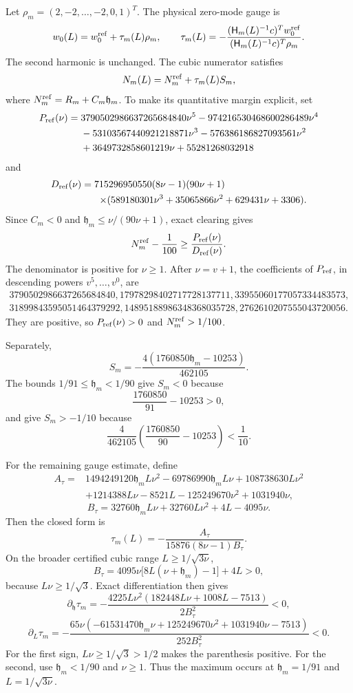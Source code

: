 \documentclass[10pt]{article}
\newcommand{\1}{\mathbf1}
\begin{document}
Let
$\rho_m=(2,-2,\ldots,-2,0,1)^T$.  The physical zero-mode gauge is
\[
 w_0(L)=w_0^{\rm ref}+\tau_m(L)\rho_m,
 \qquad
 \tau_m(L)=-\frac{(\mathsf H_m(L)^{-1}c)^Tw_0^{\rm ref}}
 {(\mathsf H_m(L)^{-1}c)^T\rho_m}.
\]
The second harmonic is unchanged.  The cubic numerator satisfies
\[
 N_m(L)=N_m^{\rm ref}+\tau_m(L)S_m,
\]
where $N_m^{\rm ref}=R_m+C_m\mathfrak h_m$.  To make its quantitative margin
explicit, set
\begin{align*}
 P_{\rm ref}(\nu)={}&3790502986637265684840\nu^5
 -974216530468600286489\nu^4\\
 &-53103567440921218871\nu^3
 -576386186827093561\nu^2\\
 &+3649732858601219\nu+55281268032918
\end{align*}
and
\begin{align*}
 D_{\rm ref}(\nu)={}&715296950550(8\nu-1)(90\nu+1)\\
 &\mathrel{}\times
 (589180301\nu^3+35065866\nu^2+629431\nu+3306).
\end{align*}
Since $C_m<0$ and $\mathfrak h_m\le\nu/(90\nu+1)$, exact clearing gives
\[
 N_m^{\rm ref}-\frac1{100}
 \ge \frac{P_{\rm ref}(\nu)}{D_{\rm ref}(\nu)}.
\]
The denominator is positive for $\nu\ge1$.  After $\nu=v+1$, the coefficients
of $P_{\rm ref}$, in descending powers $v^5,\ldots,v^0$, are
\begin{gather*}
3790502986637265684840,
17978298402717728137711,
33955060177057334483573,\\
31899843595051464379292,
14895188986348368035728,
2762610207555043720056.
\end{gather*}
They are positive, so $P_{\rm ref}(\nu)>0$ and
$N_m^{\rm ref}>1/100$.

Separately,
\[
 S_m=-\frac{4(1760850\mathfrak h_m-10253)}{462105}.
\]
The bounds $1/91\le\mathfrak h_m<1/90$ give $S_m<0$ because
\[
 \frac{1760850}{91}-10253>0,
\]
and give $S_m>-1/10$ because
\[
 \frac4{462105}\left(\frac{1760850}{90}-10253\right)<\frac1{10}.
\]

For the remaining gauge estimate, define
\begin{align*}
 A_\tau={}&1494249120\mathfrak h_mL\nu^2
 -69786990\mathfrak h_mL\nu+108738630L\nu^2\\
 &+1214388L\nu-8521L-125249670\nu^2+1031940\nu,
\end{align*}
\[
 B_\tau=32760\mathfrak h_mL\nu+32760L\nu^2+4L-4095\nu.
\]
Then the closed form is
\[
 \tau_m(L)=-\frac{A_\tau}{15876(8\nu-1)B_\tau}.
\]
On the broader certified cubic range $L\ge1/\sqrt{3\nu}$,
\[
 B_\tau=4095\nu\bigl[8L(\nu+\mathfrak h_m)-1\bigr]+4L>0,
\]
because $L\nu\ge1/\sqrt3$.  Exact differentiation then gives
\[
 \partial_{\mathfrak h}\tau_m
 =-\frac{4225L\nu^2(182448L\nu+1008L-7513)}{2B_\tau^2}<0,
\]
\[
 \partial_L\tau_m
 =-\frac{65\nu(-61531470\mathfrak h_m\nu
 +125249670\nu^2+1031940\nu-7513)}{252B_\tau^2}<0.
\]
For the first sign, $L\nu\ge1/\sqrt3>1/2$ makes the parenthesis positive.
For the second, use $\mathfrak h_m<1/90$ and $\nu\ge1$.  Thus the maximum
occurs at $\mathfrak h_m=1/91$ and $L=1/\sqrt{3\nu}$.
\end{document}
